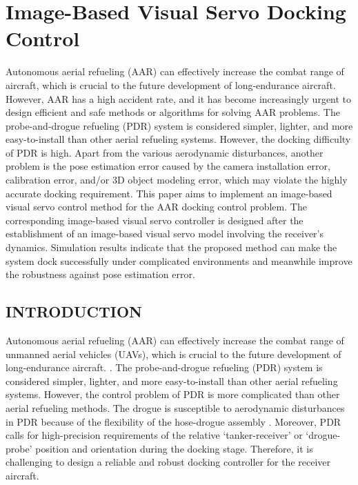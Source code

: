 
\chapter{Image-Based Visual Servo Docking Control}

Autonomous aerial refueling (AAR) can effectively increase the combat range of aircraft, which is crucial to the future development of long-endurance aircraft. However, AAR has a high accident rate, and it has become increasingly urgent to design efficient and safe methods or algorithms for solving AAR problems. The probe-and-drogue refueling (PDR) system is considered simpler, lighter, and more easy-to-install than other aerial refueling systems. However, the docking difficulty of PDR is high. Apart from the various aerodynamic disturbances, another problem is the pose estimation error caused by the camera installation error, calibration error, and/or 3D object modeling error, which may violate the highly accurate docking requirement. This paper aims to implement an image-based visual servo control method for the AAR docking control problem. The corresponding image-based visual servo controller is designed after the establishment of an image-based visual servo model involving the receiver's dynamics. Simulation results indicate that the proposed method can make the system dock successfully under complicated environments and meanwhile improve the robustness against pose estimation error.

\section{INTRODUCTION}
Autonomous aerial refueling (AAR) can effectively increase the combat range of unmanned aerial vehicles (UAVs), which is crucial to the future development of long-endurance aircraft. \cite{nalepka2005automated}. The probe-and-drogue refueling (PDR) system is considered simpler, lighter, and more easy-to-install than other aerial refueling systems. However, the control problem of PDR is more complicated than other aerial refueling methods. The drogue is susceptible to aerodynamic disturbances in PDR because of the flexibility of the hose-drogue assembly \cite{THOMAS201414,DAI2016448,7738351}. Moreover, PDR calls for high-precision  requirements of the relative `tanker-receiver' or `drogue-probe' position and orientation during the docking stage. Therefore, it is challenging to design a reliable and robust docking controller for the receiver aircraft. 

